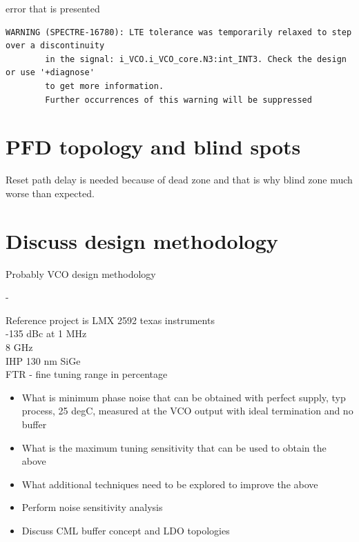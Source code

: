 \documentclass{article}
\begin{document}
error that is presented

\begin{verbatim}
WARNING (SPECTRE-16780): LTE tolerance was temporarily relaxed to step over a discontinuity
		in the signal: i_VCO.i_VCO_core.N3:int_INT3. Check the design or use '+diagnose' 
		to get more information.
        Further occurrences of this warning will be suppressed
\end{verbatim}



\section{PFD topology and blind spots}


Reset path delay is needed because of dead zone and that is why blind zone much worse than expected. %


\section{Discuss design methodology}

Probably VCO design methodology

\begin{question}
	-
\end{question}


Reference project is LMX 2592 texas instruments
\\
-135 dBc at  1 MHz %
\\
8 GHz
\\
IHP 130 nm SiGe
\\
FTR - fine tuning range in percentage

\begin{itemize}

	\item What is minimum phase noise that can be obtained with perfect supply, typ process, 25 degC, measured at the VCO output with ideal termination and no buffer
	\item What is the maximum  tuning sensitivity that can be used to obtain the above
	\item What additional techniques need to be explored to improve the above
	\item Perform noise sensitivity analysis 
	\item Discuss CML buffer concept and LDO topologies
	
\end{itemize}
\end{document}
